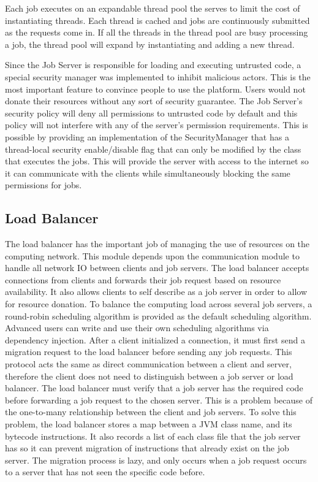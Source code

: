 Each job executes on an expandable thread pool the serves to limit
the cost of instantiating threads. Each thread is cached and jobs
are continuously submitted as the requests come in. If all the threads
in the thread pool are busy processing a job, the thread pool will
expand by instantiating and adding a new thread.

Since the Job Server is responsible for loading and executing untrusted
code, a special security manager was implemented to inhibit malicious actors.
This is the most important feature to convince people to use the platform.
Users would not donate their resources without any sort of security guarantee.
The Job Server's security policy will deny all permissions to untrusted code
by default and this policy will not interfere with any of the server's
permission requirements. This is possible by providing an implementation
of the SecurityManager that has a thread-local security enable/disable flag
that can only be modified by the class that executes the jobs. This will provide
the server with access to the internet so it can communicate with the clients
while simultaneously blocking the same permissions for jobs.

\subsection{Load Balancer}\label{subsec:modules}

The load balancer has the important job of managing the use of resources
on the computing network.
This module depends upon the communication module to handle all network IO
between clients and job servers.
The load balancer accepts connections from clients and forwards their job
request based on resource availability.
It also allows clients to self describe as a job server in order to allow for
resource donation.
To balance the computing load across several job servers, a round-robin
scheduling algorithm is provided as the default scheduling algorithm.
Advanced users can write and use their own scheduling algorithms via dependency
injection.
After a client initialized a connection, it must first send a migration request
to the load balancer before sending any job requests.
This protocol acts the same as direct communication between a client and server,
therefore the client does not need to distinguish between a job server or load
balancer.
The load balancer must verify that a job server has the required
code before forwarding a job request to the chosen server.
This is a problem because of the one-to-many relationship between the client
and job servers.
To solve this problem, the load balancer stores a map between
a JVM class name, and its bytecode instructions.
It also records a list of each class file that the job server has so it can
prevent migration of instructions that already exist on the job server.
The migration process is lazy, and only occurs when a job request
occurs to a server that has not seen the specific code before.
